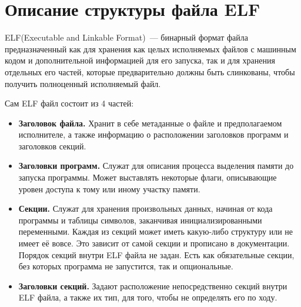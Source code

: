 \documentclass[14pt, russian, onesize]{extreport}
\begin{document}
\section*{Описание структуры файла ELF}
ELF(Executable and Linkable Format)~--- бинарный формат файла предназначенный
как для хранения как целых исполняемых файлов с машинным кодом и дополнительной
информацией для его запуска, так и для хранения отдельных его частей, которые
предварительно должны быть слинкованы, чтобы получить полноценный исполняемый
файл. 

Сам ELF файл состоит из 4 частей:
\begin{itemize}
    \item \textbf{Заголовок файла.}
        Хранит в себе метаданные о файле и предполагаемом исполнителе,
        а также информацию о расположении заголовков программ и заголовков секций.
    \item \textbf{Заголовки программ.}
        Служат для описания процесса выделения памяти до запуска программы. 
        Может выставлять некоторые флаги, описывающие уровен доступа
        к тому или иному участку памяти.
    \item \textbf{Секции.}
        Служат для хранения произвольных данных, начиная от кода программы
        и таблицы символов, заканчивая инициализированными переменными.
        Каждая из секций может иметь какую-либо структуру или не имеет
        её вовсе. Это зависит от самой секции и прописано в документации.
        Порядок секций внутри ELF файла не задан. Есть как обязательные
        секции, без которых программа не запустится, так и опциональные.
    \item \textbf{Заголовки секций.}
        Задают расположение непосредственно секций внутри ELF файла,
        а также их тип, для того, чтобы не определять его по ходу.
\end{itemize}
\end{document}

